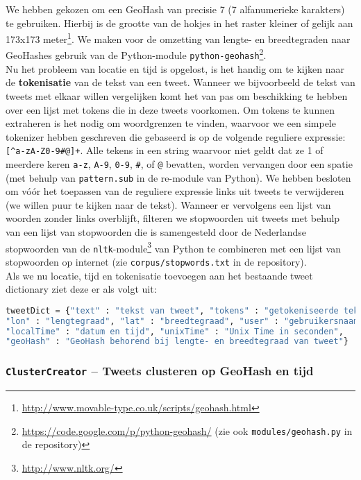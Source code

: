 \documentclass[a4paper,10pt,titlepage]{article}
\def\vl{\\[9pt]}                              %
\def\sss{\subsubsection}                      %
\def\ttt{\texttt}                             %
\def\bf{\textbf}                              %
\begin{document}
{{We hebben gekozen om een GeoHash van precisie 7 (7 alfanumerieke karakters) te gebruiken. 
Hierbij is de grootte van de hokjes in het raster kleiner of gelijk aan 173x173 
meter\footnote{\url{http://www.movable-type.co.uk/scripts/geohash.html}}. We maken voor de omzetting van lengte- en breedtegraden naar GeoHashes 
gebruik van de Python-module \ttt{python-geohash}\footnote{\url{https://code.google.com/p/python-geohash/} (zie ook \ttt{modules/geohash.py} in de repository)}.
\vl
Nu het probleem van locatie en tijd is opgelost, is het handig om te kijken naar 
de \bf{tokenisatie} van de tekst van een tweet. Wanneer we bijvoorbeeld de tekst van 
tweets met elkaar willen vergelijken komt het van pas om beschikking te hebben 
over een lijst met tokens die in deze tweets voorkomen. Om tokens te kunnen 
extraheren is het nodig om woordgrenzen te vinden, waarvoor we een simpele 
tokenizer hebben geschreven die gebaseerd is op de volgende reguliere expressie: 
\verb|[^a-zA-Z0-9#@]+|. Alle tekens in een string waarvoor niet geldt dat ze 1 of 
meerdere keren \ttt{a-z}, \ttt{A-9}, \ttt{0-9}, \ttt{\#}, of \ttt{@} bevatten, worden vervangen door een spatie 
(met behulp van \ttt{pattern.sub} in de {re}-module van Python). We hebben besloten om 
vóór het toepassen van de reguliere expressie links uit tweets te verwijderen 
(we willen puur te kijken naar de tekst). Wanneer er vervolgens een lijst van 
woorden zonder links overblijft, filteren we stopwoorden uit tweets met behulp 
van een lijst van stopwoorden die is samengesteld door de Nederlandse 
stopwoorden van de \ttt{nltk}-module\footnote{\url{http://www.nltk.org/}} van Python te combineren met een lijst van 
stopwoorden op internet (zie \ttt{corpus/stopwords.txt} in de repository).
\vl
Als we nu locatie, tijd en tokenisatie toevoegen aan het bestaande tweet 
dictionary ziet deze er als volgt uit:

\begin{lstlisting}[language=Python]
tweetDict = {"text" : "tekst van tweet", "tokens" : "getokeniseerde tekst", 
"lon" : "lengtegraad", "lat" : "breedtegraad", "user" : "gebruikersnaam", 
"localTime" : "datum en tijd", "unixTime" : "Unix Time in seconden", 
"geoHash" : "GeoHash behorend bij lengte- en breedtegraad van tweet"}
\end{lstlisting}
\vspace*{-10pt}

\sss{\ttt{ClusterCreator} – Tweets clusteren op GeoHash en tijd}\label{ClusterCreator}

}}
\end{document}
